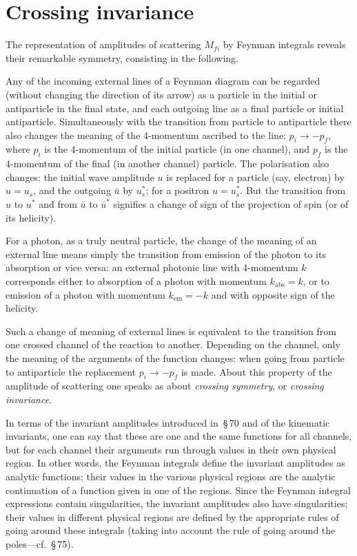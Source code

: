 \section{Crossing invariance}

The representation of amplitudes of scattering $M_{fi}$ by Feynman integrals reveals their remarkable symmetry, consisting in the following.

Any of the incoming external lines of a Feynman diagram can be regarded (without changing the direction of its arrow) as a particle in the initial or antiparticle in the final state, and each outgoing line as a final particle or initial antiparticle. Simultaneously with the transition from particle to antiparticle there also changes the meaning of the 4-momentum ascribed to the line: $p_i \to -p_f$, where $p_i$ is the 4-momentum of the initial particle (in one channel), and $p_f$ is the 4-momentum of the final (in another channel) particle. The polarisation also changes: the initial wave amplitude $u$ is replaced for a particle (say, electron) by $u = u_s$, and the outgoing $\bar{u}$ by $u^*_s$; for a positron $u = u^*_s$. But the transition from $u$ to $u^*$ and from $\bar{u}$ to $\bar{u}^*$ signifies a change of sign of the projection of spin (or of its helicity).

For a photon, as a truly neutral particle, the change of the meaning of an external line means simply the transition from emission of the photon to its absorption or vice versa: an external photonic line with 4-momentum $k$ corresponds either to absorption of a photon with momentum $k_{\text{abs}} = k$, or to emission of a photon with momentum $k_{\text{em}} = -k$ and with opposite sign of the helicity.

Such a change of meaning of external lines is equivalent to the transition from one crossed channel of the reaction to another. Depending on the channel, only the meaning of the arguments of the function changes: when going from particle to antiparticle the replacement $p_i \to -p_f$ is made. About this property of the amplitude of scattering one speaks as about \textit{crossing symmetry}, or \textit{crossing invariance}.

In terms of the invariant amplitudes introduced in~\S\,70 and of the kinematic invariants, one can say that these are one and the same functions for all channels, but for each channel their arguments run through values in their own physical region. In other words, the Feynman integrals define the invariant amplitudes as analytic functions; their values in the various physical regions are the analytic continuation of a function given in one of the regions. Since the Feynman integral expressions contain singularities, the invariant amplitudes also have singularities; their values in different physical regions are defined by the appropriate rules of going around these integrals (taking into account the rule of going around the poles---cf.~\S\,75).

